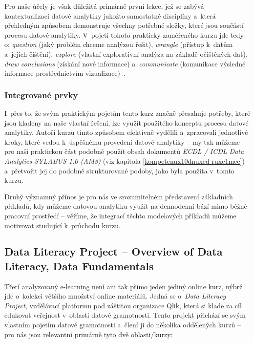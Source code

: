Pro naše účely je však důležitá primárně první lekce, jež se zabývá kontextualizací datové analytiky jakožto samostatné disciplíny a~která přehledným způsobem demonstruje všechny potřebné složky, které jsou součástí procesu datové analytiky. V~pojetí tohoto prakticky zaměřeného kurzu jde tedy o: \emph{question} (jaký problém chceme analýzou řešit), \emph{wrangle} (přístup k~datům a~jejich čištění), \emph{explore} (vlastní explorativní analýza na základě očištěných dat), \emph{draw conclusions} (získání nové informace) a~\emph{communicate} (komunikace výsledné informace prostřednictvím vizualizace)~\parencite{course2}.

\hypertarget{integrovanuxe9-prvky-1}{%
\subsubsection{Integrované prvky}\label{integrovanuxe9-prvky-1}}

I~přes to, že svým praktickým pojetím tento kurz značně přesahuje potřeby, které jsou kladeny na naše vlastní řešení, lze využít použitého konceptu procesu datové analytiky. Autoři kurzu tímto způsobem efektivně vydělili a~zpracovali jednotlivé kroky, které vedou k~úspěšnému provedení datové analytiky -- my tak můžeme pro naši praktickou část podobně použít obsah dokumentů \emph{ECDL / ICDL Data Analytics SYLABUS 1.0 (AM8)} (viz kapitola \ref{kompetenux10dnuxed-ruxe1mec}) a~přetvořit jej do podobně strukturované podoby, jako byla použita v~tomto kurzu.

Druhý významný přínos je pro nás ve srozumitelném představení základních příkladů, kdy můžeme datovou analytiku využít na dennodenní bází mimo běžné pracovní prostředí -- věříme, že integrací těchto modelových příkladů můžeme motivovat studující k~průchodu kurzu.

\hypertarget{data-literacy-project-overview-of-data-literacy-data-fundamentals}{%
\subsection{Data Literacy Project -- Overview of Data Literacy, Data Fundamentals}\label{data-literacy-project-overview-of-data-literacy-data-fundamentals}}

Třetí analyzovaný e-learning není ani tak přímo jeden jediný online kurz, nýbrž jde o~kolekci většího množství online materiálů. Jedná se o~\emph{Data Literacy Project}, vzdělávací platformu pod záštitou organizace Qlik, která si klade za cíl edukovat veřejnost v~oblasti datové gramotnosti. Tento projekt přichází se svým vlastním pojetím datové gramotnosti a~člení ji do několika oddělených kurzů -- pro nás jsou relevantní primárně tyto dvě oblasti/kurzy:

